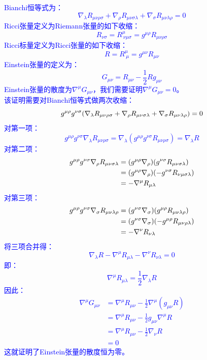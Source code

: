 \documentclass[a4paper]{article}
\begin{document}
\begin{enumerate}
    \textcolor{blue}{
    Bianchi恒等式为：
    \[
        \nabla_\lambda R_{\mu\nu\rho\sigma} + \nabla_\rho R_{\mu\nu\sigma\lambda} + \nabla_\sigma R_{\mu\nu\lambda\rho} = 0
    \]
    Ricci张量定义为Riemann张量的如下收缩：
    \[
        R_{\nu\sigma} = R^{\mu}_{\ \nu\mu\sigma} = g^{\mu\rho} R_{\mu\nu\rho\sigma}
    \]
    Ricci标量定义为Ricci张量的如下收缩：
    \[
        R = R^{\mu}_{\ \mu} = g^{\mu\nu} R_{\mu\nu}
    \]
    Einstein张量的定义为：
    \[
        G_{\mu\nu} = R_{\mu\nu} - \frac{1}{2} R g_{\mu\nu}
    \]
    Einstein张量的散度为$\nabla^\mu G_{\mu\nu}$，我们需要证明$\nabla^\mu G_{\mu\nu} = 0$。 \\
    该证明需要对Bianchi恒等式做两次收缩：
    \[
        g^{\mu\rho} g^{\nu\sigma} \qty(\nabla_\lambda R_{\mu\nu\rho\sigma} + \nabla_\rho R_{\mu\nu\sigma\lambda} + \nabla_\sigma R_{\mu\nu\lambda\rho}) = 0
    \]
    对第一项：
    \[
        g^{\mu\rho} g^{\nu\sigma} \nabla_\lambda R_{\mu\nu\rho\sigma}
        = \nabla_\lambda (g^{\mu\rho} g^{\nu\sigma} R_{\mu\nu\rho\sigma})
        = \nabla_\lambda R
    \]
    对第二项：
    \begin{align*}
        g^{\mu\rho} g^{\nu\sigma} \nabla_\rho R_{\mu\nu\sigma\lambda}
        &= \qty(g^{\mu\rho} \nabla_\rho) \qty(g^{\nu\sigma} R_{\mu\nu\sigma\lambda}) \\
        &= \qty(g^{\mu\rho} \nabla_\rho) \qty(-g^{\nu\sigma} R_{\nu\mu\sigma\lambda}) \\
        &= -\nabla^\mu R_{\mu\lambda}
    \end{align*}
    对第三项：
    \begin{align*}
        g^{\mu\rho} g^{\nu\sigma} \nabla_\sigma R_{\mu\nu\lambda\rho}
        &= \qty(g^{\nu\sigma} \nabla_\sigma) \qty(g^{\mu\rho} R_{\mu\nu\lambda\rho}) \\
        &= \qty(g^{\nu\sigma} \nabla_\sigma) \qty(-g^{\mu\rho} R_{\mu\nu\rho\lambda}) \\
        &= -\nabla^\nu R_{\nu\lambda}
    \end{align*}
    将三项合并得：
    \[
        \nabla_\lambda R - \nabla^\mu R_{\mu\lambda} - \nabla^\nu R_{\nu\lambda} = 0
    \]
    即：
    \[
        \nabla^\mu R_{\mu\lambda} = \frac{1}{2} \nabla_\lambda R
    \]
    因此：
    \begin{align*}
        \nabla^\mu G_{\mu\nu}
        &= \nabla^\mu R_{\mu\nu} - \frac{1}{2} \nabla^\mu (g_{\mu\nu} R) \\
        &= \nabla^\mu R_{\mu\nu} - \frac{1}{2} g_{\mu\nu} \nabla^\mu R \\
        &= \nabla^\mu R_{\mu\nu} - \frac{1}{2} \nabla_\nu R \\
        &= 0
    \end{align*}
    这就证明了Einstein张量的散度恒为零。
    }

\end{enumerate}
\end{document}
